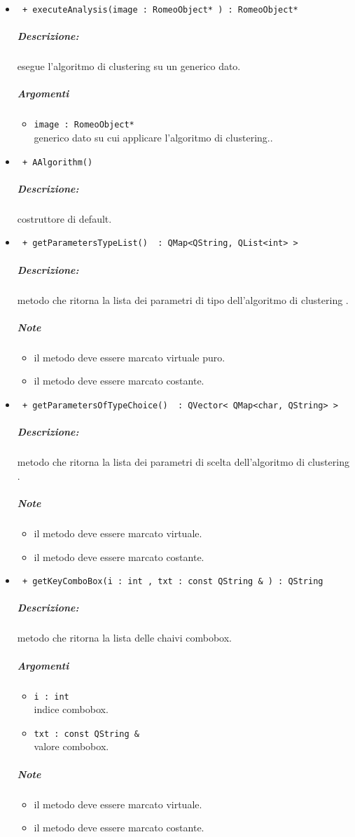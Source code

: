 \begin{itemize}
			
	\item \color{blue}\verb! + executeAnalysis(image : RomeoObject* ) : RomeoObject*!
		\color{black}
		\subparagraph{Descrizione:} esegue l'algoritmo di clustering\g{} su un generico dato.
		\subparagraph{Argomenti}
			\begin{itemize}
				\item \color{RoyalPurple} \verb!image : RomeoObject* ! \\ 
				\color{black} generico dato su cui applicare l'algoritmo di clustering\g{}..		
			\end{itemize}
			
	\item \color{blue}\verb! + AAlgorithm()!
		\color{black}
		\subparagraph{Descrizione:} costruttore di default.
			
	\item \color{blue}\verb! + getParametersTypeList()  : QMap<QString, QList<int> >!
		\color{black}
		\subparagraph{Descrizione:} metodo che ritorna la lista dei parametri di tipo dell'algoritmo di clustering\g{} .
		\subparagraph{Note}
			\begin{itemize}
				\item il metodo deve essere marcato virtuale puro.
				\item il metodo deve essere marcato costante.
			\end{itemize}	
			
	\item \color{blue}\verb! + getParametersOfTypeChoice()  : QVector< QMap<char, QString> >!
		\color{black}
		\subparagraph{Descrizione:} metodo che ritorna la lista dei parametri di scelta dell'algoritmo di clustering\g{} .
		\subparagraph{Note}
			\begin{itemize}
				\item il metodo deve essere marcato virtuale.
				\item il metodo deve essere marcato costante.
			\end{itemize}	
	
	\item \color{blue}\verb! + getKeyComboBox(i : int , txt : const QString & ) : QString!
		\color{black}
		\subparagraph{Descrizione:} metodo che ritorna la lista delle chaivi combobox.
		\subparagraph{Argomenti}
			\begin{itemize}
				\item \color{RoyalPurple} \verb!i : int ! \\ 
				\color{black} indice combobox.
				\item \color{RoyalPurple} \verb!txt : const QString & ! \\ 
				\color{black} valore combobox.		
			\end{itemize}
		\subparagraph{Note}
			\begin{itemize}
				\item il metodo deve essere marcato virtuale.
				\item il metodo deve essere marcato costante.
			\end{itemize}	
			

\end{itemize}
